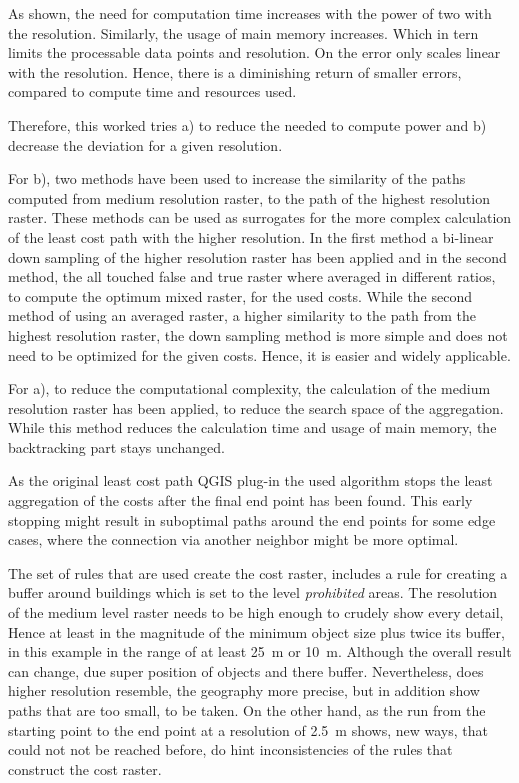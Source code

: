 As shown, the need for computation time increases with the power of two with the resolution. 
Similarly, the usage of main memory increases. 
Which in tern limits the processable data points and resolution.
On the error only scales linear with the resolution. 
Hence, there is a diminishing return of smaller errors, compared to compute time and resources used.

Therefore, this worked tries a) to reduce the needed to compute power and b) decrease the deviation for a given resolution.

For b), two methods have been used to increase the similarity of the paths computed from medium resolution raster, to the path of the highest resolution raster.
These methods can be used as surrogates for the more complex calculation of the least cost path with the higher resolution.
In the first method a bi-linear down sampling of the higher resolution raster has been applied and in the second method, the all touched false and true raster where averaged in different ratios, to compute the optimum mixed raster, for the used costs.
While the second method of using an averaged raster, a higher similarity to the path from the highest resolution raster, the down sampling method is more
simple and does not need to be optimized for the given costs.
Hence, it is easier and widely applicable.

For a), to reduce the computational complexity, the calculation of the medium resolution raster has been applied, to reduce the search space of the aggregation.
While this method reduces the calculation time and usage of main memory, the backtracking part stays unchanged.



As the original least cost path QGIS plug-in the used algorithm stops the least aggregation of the costs after the final end point has been found.
This early stopping might result in suboptimal paths around the end points for some edge cases, where the connection via another neighbor might be more optimal.

The set of rules that are used create the cost raster, includes a rule for creating a buffer around buildings  which is set to the level \textit{prohibited} areas.
The resolution of the medium level raster needs to be high enough to crudely show every detail, Hence at least in the magnitude of the minimum object size plus twice its buffer, in this example in the range of at least 25~m or 10~m.
Although the overall result can change, due super position of objects and there buffer.
Nevertheless, does higher resolution resemble, the geography more precise, but in addition show paths that are too small, to be taken.
On the other hand, as the run from the starting point to the end point at a resolution of 2.5~m shows, new ways, that could not not be reached before, do hint inconsistencies of the rules that construct the cost raster.

